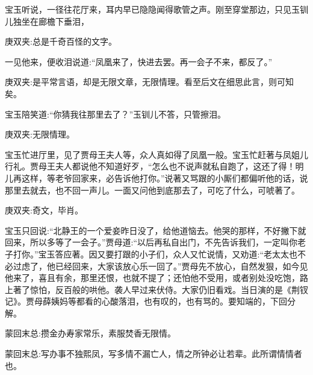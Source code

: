 \begin{parag}
    宝玉听说，一径往花厅来，耳内早已隐隐闻得歌管之声。刚至穿堂那边，只见玉钏儿独坐在廊檐下垂泪，\begin{note}庚双夹:总是千奇百怪的文字。\end{note}一见他来，便收泪说道:“凤凰来了，快进去罢。再一会子不来，都反了。”\begin{note}庚双夹:是平常言语，却是无限文章，无限情理。看至后文在细思此言，则可知矣。\end{note}宝玉陪笑道:“你猜我往那里去了？”玉钏儿不答，只管擦泪。\begin{note}庚双夹:无限情理。\end{note}宝玉忙进厅里，见了贾母王夫人等，众人真如得了凤凰一般。宝玉忙赶著与凤姐儿行礼。贾母王夫人都说他不知道好歹，“怎么也不说声就私自跑了，这还了得！明儿再这样，等老爷回家来，必告诉他打你。”说著又骂跟的小厮们都偏听他的话，说那里去就去，也不回一声儿。一面又问他到底那去了，可吃了什么，可唬著了。\begin{note}庚双夹:奇文，毕肖。\end{note}宝玉只回说:“北静王的一个爱妾昨日没了，给他道恼去。他哭的那样，不好撇下就回来，所以多等了一会子。”贾母道:“以后再私自出门，不先告诉我们，一定叫你老子打你。”宝玉答应著。因又要打跟的小子们，众人又忙说情，又劝道:“老太太也不必过虑了，他已经回来，大家该放心乐一回了。”贾母先不放心，自然发狠，如今见他来了，喜且有余，那里还恨，也就不提了；还怕他不受用，或者别处没吃饱，路上著了惊怕，反百般的哄他。袭人早过来伏侍。大家仍旧看戏。当日演的是《荆钗记》。贾母薛姨妈等都看的心酸落泪，也有叹的，也有骂的。要知端的，下回分解。
\end{parag}


\begin{parag}
    \begin{note}蒙回末总:攒金办寿家常乐，素服焚香无限情。\end{note}
\end{parag}


\begin{parag}
    \begin{note}蒙回末总:写办事不独熙凤，写多情不漏亡人，情之所钟必让若辈。此所谓情情者也。\end{note}
\end{parag}

